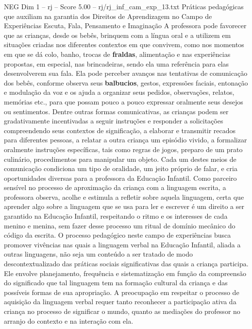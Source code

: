 \begin{textsample}{NEG Dim 1 – rj – Score 5.00 – rj/rj\_inf\_cam\_exp\_13.txt}  \label{ex:f1_neg_010}
Práticas pedagógicas que auxiliam na garantia dos Direitos de Aprendizagem no Campo de Experiências Escuta, Fala, Pensamento e Imaginação A professora pode favorecer que as crianças, desde os bebês, brinquem com a língua oral e a utilizem em situações criadas nos diferentes contextos em que convivem, como nos momentos em que se dá colo, banho, trocas de \textbf{fraldas}, alimentação e nas experiências propostas, em especial, nas brincadeiras, sendo ela uma referência para elas desenvolverem sua fala.
Ela pode perceber avanços nas tentativas de comunicação dos bebês, conforme observa seus \textbf{balbucios}, gestos, expressões faciais, entonação e modulação da voz e os ajuda a organizar seus pedidos, observações, relatos, memórias etc., para que possam pouco a pouco expressar oralmente seus desejos ou sentimentos.
Dentre outras formas comunicativas, as crianças podem ser gradativamente incentivadas a seguir instruções e responder a solicitações compreendendo seus contextos de significação, a elaborar e transmitir recados para diferentes pessoas, a relatar a outra criança um episódio vivido, a formalizar oralmente instruções específicas, tais como regras de jogos, preparo de um prato culinário, procedimentos para manipular um objeto.
Cada um destes meios de comunicação condiciona um tipo de oralidade, um jeito próprio de falar, e cria oportunidades diversas para a professora da Educação Infantil.
Como parceiro sensível no processo de aproximação da criança com a linguagem escrita, a professora observa, acolhe e estimula a refletir sobre aquela linguagem, certa que aprender algo sobre a linguagem que se usa para ler e escrever é um direito a ser garantido na Educação Infantil, respeitando o ritmo e os interesses de cada menino e menina, sem fazer desse processo um ritual de domínio mecânico do código da escrita.
O processo pedagógico neste campo de experiências busca promover vivências nas quais a linguagem verbal na Educação Infantil, aliada a outras linguagens, não seja um conteúdo a ser tratado de modo descontextualizado das práticas sociais significativas das quais a criança participa.
Ele envolve planejamento, frequência e sistematização em função da compreensão do significado que tal linguagem tem na formação cultural da criança e das possíveis formas de sua apropriação.
A preocupação em respeitar o processo de aquisição da linguagem verbal requer tanto reconhecer a participação ativa da criança no processo de significar o mundo, quanto as mediações do professor no arranjo do contexto e na interação com ela.

\end{textsample}
